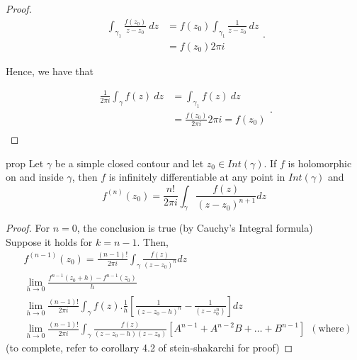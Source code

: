 \begin{proof}
	\[
	\begin{split}
		\int_{{\gamma_1}}^{{}} {\frac{f\left( z_0 \right) }{z-z_0}} \: d{z} {}  &= f\left( z_0 \right) \int_{{\gamma_1}}^{{}} {\frac{1}{z-z_0}} \: d{z} {} \\							&= f\left( z_0 \right) 2 \pi i 
	\end{split}
	.\] 

	Hence, we have that 

	
	\[
	\begin{split}
		\frac{1}{2 \pi i}\int_{{\gamma}}^{{}} {f\left( z \right) } \: d{z} {} &= \int_{{\gamma_1}}^{{}} {f\left( z \right) } \: d{z} {} \\ 
										      &=  \frac{f \left( z_0 \right)}{2 \pi i} 2 \pi i = f\left( z_0 \right)  \\
	\end{split}
	.\] 
\end{proof}
\begin{restatable}{prop}{}\label{}
Let $\gamma$ be a simple closed contour and let $z_0\in Int(\gamma)$. If $f$ is holomorphic on and inside $\gamma$, then $f$ is infinitely differentiable at any point in $Int(\gamma)$ and\\
\begin{equation*}
    f^{(n)}(z_0)=\frac{n!}{2\pi i}\int_{\gamma}^{}\frac{f(z)}{(z-z_0)^{n+1}} dz
\end{equation*}
\end{restatable}
\begin{proof}
For $n=0$, the conclusion is true (by Cauchy's Integral formula)\\
Suppose it holds for $k=n-1$. Then,\\
\begin{equation*}
    \begin{split}
    &f^{(n-1)}(z_0)=\frac{(n-1)!}{2\pi i}\int_{\gamma}^{}\frac{f(z)}{(z-z_0)^n} dz\\
    &\lim_{h \to 0} \frac{f^{n-1}(z_0+h)-f^{n-1}(z_0)}{h}\\
    &\lim_{h \to 0} \frac{(n-1)!}{2\pi i}\int_{\gamma}^{} f(z).\frac{1}{h}[\frac{1}{(z-z_0-h)^n}-\frac{1}{(z-z_0^n)}] dz\\
    &\lim_{h \to 0} \frac{(n-1)!}{2\pi i}\int_{\gamma}^{} \frac{f(z)}{(z-z_0-h)(z-z_0)}[A^{n-1}+A^{n-2}B+\dots +B^{n-1}] \:\:(\text{where})
    \end{split}
\end{equation*}
(to complete, refer to corollary 4.2 of stein-shakarchi for proof)
\end{proof}
